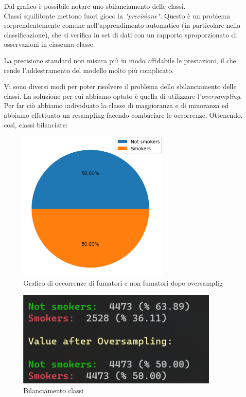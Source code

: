 \documentclass{article}
\begin{document}
\noindent
Dal grafico è possibile notare uno sbilanciamento delle classi.\\
Classi squilibrate mettono fuori gioco la \textit{"precisione"}. Questo è un problema sorprendentemente comune nell'apprendimento automatico (in particolare nella classificazione), che si verifica in set di dati con un rapporto sproporzionato di osservazioni in ciascuna classe.

\noindent
La precisione standard non misura più in modo affidabile le prestazioni, il che rende l'addestramento del modello molto più complicato. \par
\frenchspacing
\noindent
Vi sono diversi modi per poter risolvere il problema dello sbilanciamento delle classi. 
La soluzione per cui abbiamo optato è quella di utilizzare l'\textit{oversampling}. 
Per far ciò abbiamo individuato la classe di maggioranza e di minoranza ed abbiamo effettuato un resampling facendo combaciare le occorrenze.
Ottenendo, così, classi bilanciate:

\begin{figure}[H]
        \includegraphics[width=7.6cm]{grafico2}
        \centering
        \caption{Grafico di occorrenze di fumatori e non fumatori dopo oversamplig}
        \centering
\end{figure}



\begin{figure}[H]
        \includegraphics[width=0.9\textwidth]{value}
        \centering
        \caption{Bilanciamento classi}
        \centering
\end{figure}
\end{document}
